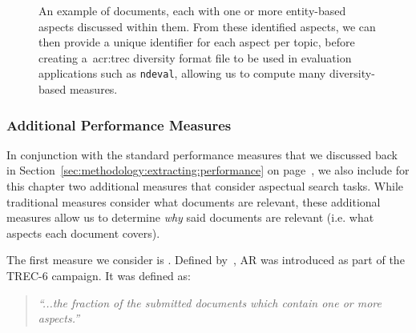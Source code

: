 \begin{figure}[t!]
    \centering
    \caption[Entity-based aspects example]{An example of documents, each with one or more entity-based aspects discussed within them. From these identified aspects, we can then provide a unique identifier for each aspect per topic, before creating a~\gls{acr:trec} diversity format file to be used in evaluation applications such as \texttt{ndeval}, allowing us to compute many diversity-based measures.}
    \label{fig:entity_ids}
\end{figure}

\subsubsection{Additional Performance Measures}\label{sec:diversity:users:measures}
In conjunction with the standard performance measures that we discussed back in Section~\ref{sec:methodology:extracting:performance} on page~\pageref{sec:methodology:extracting:performance}, we also include for this chapter two additional measures that consider aspectual search tasks. While traditional measures consider what documents are relevant, these additional measures allow us to determine \emph{why} said documents are relevant (i.e. what aspects each document covers).

The first measure we consider is . Defined by~\cite{over1998trec}, AR was introduced as part of the TREC-6 campaign. It was defined as:

\begin{quote}
    \emph{``...the fraction of the submitted documents which contain one or more aspects.''}
\end{quote}

